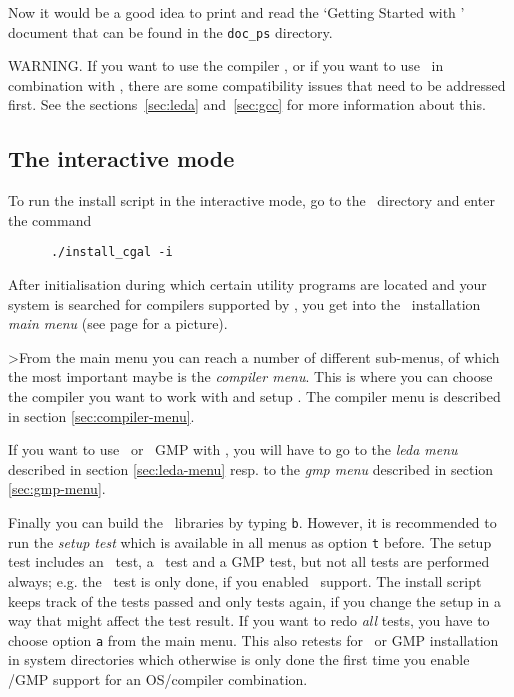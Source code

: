 Now it would be a good idea to print and read the `Getting Started
with \cgal' document that can be found in the \texttt{doc\_ps}
directory.

WARNING.  If you want to use the compiler , or if you want to
use \leda\ in combination with \cgal, there are some compatibility
issues that need to be addressed first.  See the
sections~\ref{sec:leda} and~\ref{sec:gcc} for more information about
this.

\subsection{The interactive mode}\label{sec:interactive-mode}

To run the install script in the interactive mode, go to the \cgaldir\ 
directory and enter the command
\begin{verbatim}
      ./install_cgal -i
\end{verbatim}

After initialisation during which certain utility programs are located
and your system is searched for compilers supported by \cgal, you get
into the \cgal\ installation {\em main menu} (see page
\pageref{pic:main-menu} for a picture).

>From the main menu you can reach a number of different sub-menus, of
which the most important maybe is the {\em compiler menu}. This is
where you can choose the compiler you want to work with and setup \stl.
The compiler menu is described in section \ref{sec:compiler-menu}.

If you want to use \leda\ or \gnu\ GMP with \cgal, you will have to go
to the {\em leda menu} described in section \ref{sec:leda-menu} resp.
to the {\em gmp menu} described in section \ref{sec:gmp-menu}.

Finally you can build the \cgal\ libraries by typing {\tt b}. However,
it is recommended to run the {\em setup test} which is available in
all menus as option {\tt t} before. The setup test includes an \stl\ 
test, a \leda\ test and a GMP test, but not all
tests are performed always; e.g. the \leda\ test is only done, if you
enabled \leda\ support. The install script keeps track of the tests
passed and only tests again, if you change the setup in a way that
might affect the test result. If you want to redo {\it all} tests, you
have to choose option {\tt a} from the main menu. This also retests
for \leda\ or GMP installation in system directories which otherwise
is only done the first time you enable \leda/GMP support for an
OS/compiler combination.

